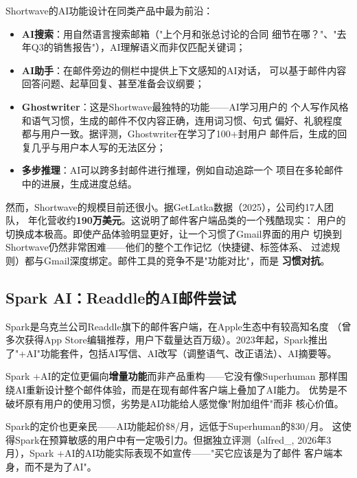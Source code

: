 Shortwave的AI功能设计在同类产品中最为前沿：

\begin{itemize}
  \item \textbf{AI搜索}：用自然语言搜索邮箱（"上个月和张总讨论的合同
    细节在哪？"、"去年Q3的销售报告"），AI理解语义而非仅匹配关键词；
  \item \textbf{AI助手}：在邮件旁边的侧栏中提供上下文感知的AI对话，
    可以基于邮件内容回答问题、起草回复、甚至准备会议纲要；
  \item \textbf{Ghostwriter}：这是Shortwave最独特的功能——AI学习用户的
    个人写作风格和语气习惯，生成的邮件不仅内容正确，连用词习惯、句式
    偏好、礼貌程度都与用户一致。据评测，Ghostwriter在学习了100+封用户
    邮件后，生成的回复几乎与用户本人写的无法区分；
  \item \textbf{多步推理}：AI可以跨多封邮件进行推理，例如自动追踪一个
    项目在多轮邮件中的进展，生成进度总结。
\end{itemize}

然而，Shortwave的规模目前还很小。据GetLatka数据（2025），公司约17人团队，
年化营收约\textbf{190万美元}。这说明了邮件客户端品类的一个残酷现实：
用户的切换成本极高。即使产品体验明显更好，让一个习惯了Gmail界面的用户
切换到Shortwave仍然非常困难——他们的整个工作记忆（快捷键、标签体系、
过滤规则）都与Gmail深度绑定。邮件工具的竞争不是"功能对比"，而是
\textbf{习惯对抗}。

\subsection{Spark AI：Readdle的AI邮件尝试}
\label{subsec:spark-ai}

Spark是乌克兰公司Readdle旗下的邮件客户端，在Apple生态中有较高知名度
（曾多次获得App Store编辑推荐，用户下载量达百万级）。2023年起，Spark推出
了"+AI"功能套件，包括AI写信、AI改写（调整语气、改正语法）、AI摘要等。

Spark +AI的定位更偏向\textbf{增量功能}而非产品重构——它没有像Superhuman
那样围绕AI重新设计整个邮件体验，而是在现有邮件客户端上叠加了AI能力。
优势是不破坏原有用户的使用习惯，劣势是AI功能给人感觉像"附加组件"而非
核心价值。

Spark的定价也更亲民——AI功能起价\$8/月，远低于Superhuman的\$30/月。
这使得Spark在预算敏感的用户中有一定吸引力。但据独立评测（alfred\_,
2026年3月），Spark +AI的AI功能实际表现不如宣传——"买它应该是为了邮件
客户端本身，而不是为了AI"。


